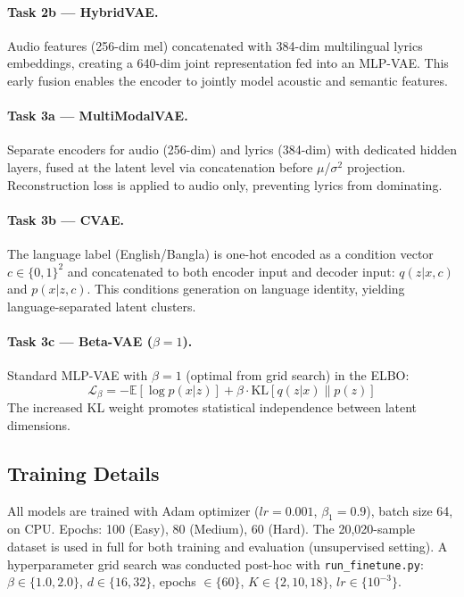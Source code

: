 \documentclass{article}
\begin{document}
\paragraph{Task 2b --- HybridVAE.} Audio features (256-dim mel) concatenated with 384-dim multilingual lyrics embeddings, creating a 640-dim joint representation fed into an MLP-VAE. This early fusion enables the encoder to jointly model acoustic and semantic features.

\paragraph{Task 3a --- MultiModalVAE.} Separate encoders for audio (256-dim) and lyrics (384-dim) with dedicated hidden layers, fused at the latent level via concatenation before $\mu$/$\sigma^2$ projection. Reconstruction loss is applied to audio only, preventing lyrics from dominating.

\paragraph{Task 3b --- CVAE.} The language label (English/Bangla) is one-hot encoded as a condition vector $c \in \{0,1\}^2$ and concatenated to both encoder input and decoder input: $q(z|x,c)$ and $p(x|z,c)$. This conditions generation on language identity, yielding language-separated latent clusters.

\paragraph{Task 3c --- Beta-VAE ($\beta\!=\!1$).} Standard MLP-VAE with $\beta\!=\!1$ (optimal from grid search) in the ELBO:
\[
\mathcal{L}_\beta = -\mathbb{E}[\log p(x|z)] + \beta \cdot \text{KL}[q(z|x)\|p(z)]
\]
The increased KL weight promotes statistical independence between latent dimensions.

\subsection{Training Details}

All models are trained with Adam optimizer ($lr\!=\!0.001$, $\beta_1\!=\!0.9$), batch size 64, on CPU. Epochs: 100 (Easy), 80 (Medium), 60 (Hard). The 20,020-sample dataset is used in full for both training and evaluation (unsupervised setting). A hyperparameter grid search was conducted post-hoc with \texttt{run\_finetune.py}: $\beta \in \{1.0, 2.0\}$, $d \in \{16, 32\}$, epochs $\in \{60\}$, $K \in \{2, 10, 18\}$, $lr \in \{10^{-3}\}$.
\end{document}
